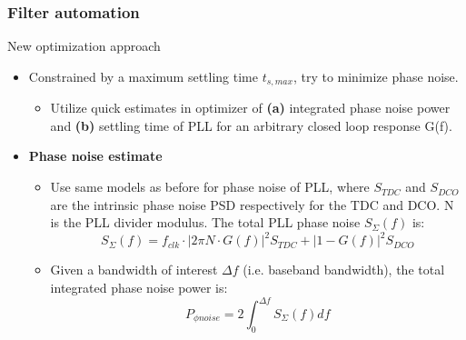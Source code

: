\documentclass[t, screen, aspectratio=43]{beamer}
\begin{document}
\begin{frame}
	\frametitle{Filter automation}
	\begin{block}{New optimization approach}
		\begin{itemize}
			\scriptsize
			\item Constrained by a maximum settling time $t_{s,max}$, try to minimize phase noise.
			\begin{itemize}
				\scriptsize
				\item Utilize quick estimates in optimizer of \textbf{(a)} integrated phase noise power and \textbf{(b)} settling time of PLL for an arbitrary closed loop response G(f).
			\end{itemize}
			\item \textbf{Phase noise estimate}
			\begin{itemize}
				\scriptsize
				\item Use same models as before for phase noise of PLL, where $S_{TDC}$ and $S_{DCO}$ are the intrinsic phase noise PSD respectively for the TDC and DCO. N is the PLL divider modulus. The total PLL phase noise $S_{\Sigma}(f)$ is:
				\begin{equation}
				S_{\Sigma}(f) = f_{clk}\cdot|2\pi N\cdot G(f)|^2S_{TDC} + |1-G(f)|^2S_{DCO}
				\end{equation}
				\item Given a bandwidth of interest $\Delta f$ (i.e. baseband bandwidth), the total integrated phase noise power is:
				\begin{equation}
				P_{\phi noise} = 2\int_0^{\Delta f} S_{\Sigma}(f)df
				\end{equation}

			\end{itemize}
		\end{itemize}    
	\end{block}
\end{frame}
\end{document}
